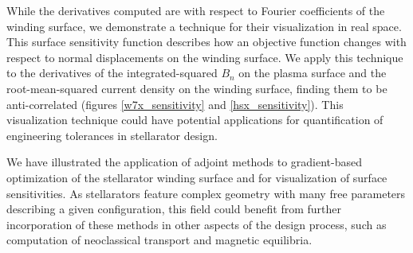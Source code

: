 \documentclass[aps,unsortedaddress]{revtex4-1}
\begin{document}
While the derivatives computed are with respect to Fourier coefficients of the winding surface, we demonstrate a technique for their visualization in real space. This surface sensitivity function describes how an objective function changes with respect to normal displacements on the winding surface. We apply this technique to the derivatives of the integrated-squared $B_n$ on the plasma surface and the root-mean-squared current density on the winding surface, finding them to be anti-correlated (figures \ref{w7x_sensitivity} and \ref{hsx_sensitivity}). This visualization technique could have potential applications for quantification of engineering tolerances in stellarator design. 

We have illustrated the application of adjoint methods to gradient-based optimization of the stellarator winding surface and for visualization of surface sensitivities. As stellarators feature complex geometry with many free parameters describing a given configuration, this field could benefit from further incorporation of these methods in other aspects of the design process, such as computation of neoclassical transport and magnetic equilibria. 

\appendix
\end{document}
